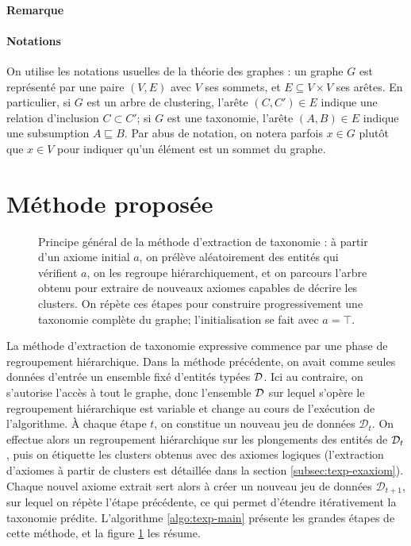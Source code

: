 \paragraph{Remarque}


\paragraph{Notations}

On utilise les notations usuelles de la théorie des graphes : un graphe $G$ est représenté par une paire $(V, E)$ avec $V$ ses sommets, et $E \subseteq V \times V$ ses arêtes. En particulier, si $G$ est un arbre de clustering, l'arête $(C, C') \in E$ indique une relation d'inclusion $C \subset C'$; si $G$ est une taxonomie, l'arête $(A, B) \in E$ indique une subsumption $A \sqsubseteq B$. Par abus de notation, on notera parfois $x \in G$ plutôt que $x \in V$ pour indiquer qu'un élément est un sommet du graphe.

\section{Méthode proposée}

\begin{figure}[h]
    \centering
    
    \caption[Aperçu de la méthode d'extraction de taxonomie expressive]{Principe général de la méthode d'extraction de taxonomie : à partir d'un axiome initial $a$, on prélève aléatoirement des entités qui vérifient $a$, on les regroupe hiérarchiquement, et on parcours l'arbre obtenu pour extraire de nouveaux axiomes capables de décrire les clusters. On répète ces étapes pour construire progressivement une taxonomie complète du graphe; l'initialisation se fait avec $a = \top$.}
    \label{fig:texp-overview}
\end{figure}

La méthode d'extraction de taxonomie expressive commence par une phase de regroupement hiérarchique. Dans la méthode précédente, on avait comme seules données d'entrée un ensemble fixé d'entités typées $\cal{D}$. Ici au contraire, on s'autorise l'accès à tout le graphe, donc l'ensemble $\cal{D}$ sur lequel s'opère le regroupement hiérarchique est variable et change au cours de l'exécution de l'algorithme. À chaque étape $t$, on constitue un nouveau jeu de données $\mathcal{D}_t$.
On effectue alors un regroupement hiérarchique sur les plongements des entités de $\cal{D}_t$, puis on étiquette les clusters obtenus avec des axiomes logiques (l'extraction d'axiomes à partir de clusters est détaillée dans la section \ref{subsec:texp-exaxiom}). Chaque nouvel axiome extrait sert alors à créer un nouveau jeu de données $\mathcal{D}_{t+1}$, sur lequel on répète l'étape précédente, ce qui permet d'étendre itérativement la taxonomie prédite. L'algorithme \ref{algo:texp-main} présente les grandes étapes de cette méthode, et la figure \ref{fig:texp-overview} les résume.



